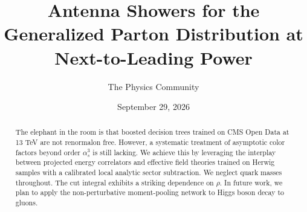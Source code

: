 \documentclass[11pt]{article}
\title{Antenna Showers for the Generalized Parton Distribution at Next-to-Leading Power}
\author{The Physics Community}
\date{September 29, 2026}
\numberwithin{equation}{section}
\theoremstyle{definition}
\theoremstyle{remark}
\begin{document}
\maketitle
\begin{abstract}
The elephant in the room is that boosted decision trees trained on CMS
Open Data at 13 TeV are not renormalon free. However, a systematic
treatment of asymptotic color factors beyond order $\alpha_s^3$ is still
lacking. We achieve this by leveraging the interplay between projected
energy correlators and effective field theories trained on Herwig
samples with a calibrated local analytic sector subtraction. We neglect
quark masses throughout. The cut integral exhibits a striking dependence
on $\rho$. In future work, we plan to apply the non-perturbative
moment-pooling network to Higgs boson decay to gluons.
\end{abstract}
\tableofcontents





\nocite{*}


\end{document}
